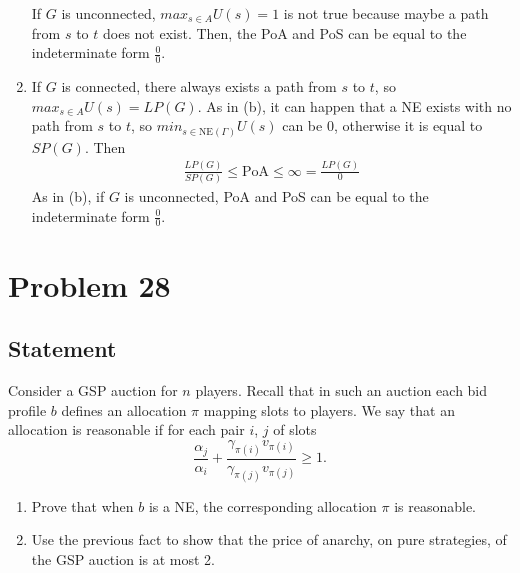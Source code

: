 \documentclass[a4paper, 11pt]{article}
\begin{document}
\begin{enumerate}[label=(\alph*)]
        If $G$ is unconnected, $max_{s \in A} U(s) = 1$ is not true because maybe a path from $s$ to $t$ does not exist. Then, the PoA and PoS can be equal to the indeterminate form $\frac{0}{0}$.
    \item If $G$ is connected, there always exists a path from $s$ to $t$, so $max_{s \in A} U(s) = LP(G)$. As in (b), it can happen that a NE exists with no path from $s$ to $t$, so $min_{s \in \text{NE}(\Gamma)} U(s)$ can be 0, otherwise it is equal to $SP(G)$. Then
        \begin{align}
            \frac{LP(G)}{SP(G)} \leq \text{PoA} \leq \infty = \frac{LP(G)}{0}
        \end{align}
        As in (b), if $G$ is unconnected, PoA and PoS can be equal to the indeterminate form $\frac{0}{0}$.
\end{enumerate}


\section*{Problem 28}
{\color{statement}
\subsection*{Statement}
Consider a GSP auction for $n$ players. Recall that in such an auction each bid profile $b$ defines an allocation $\pi$ mapping slots to players. We say that an allocation is reasonable if for each pair $i$, $j$ of slots
\begin{equation*}
    \frac{\alpha_j}{\alpha_i} + \frac{\gamma_{\pi(i)}v_{\pi(i)}}{\gamma_{\pi(j)}v_{\pi(j)}} \geq 1.
\end{equation*}
\begin{enumerate}[label=(\alph*)]
    \item Prove that when $b$ is a NE, the corresponding allocation $\pi$ is reasonable.
    \item Use the previous fact to show that the price of anarchy, on pure strategies, of the GSP auction is at most 2.
\end{enumerate}

}
\end{document}
